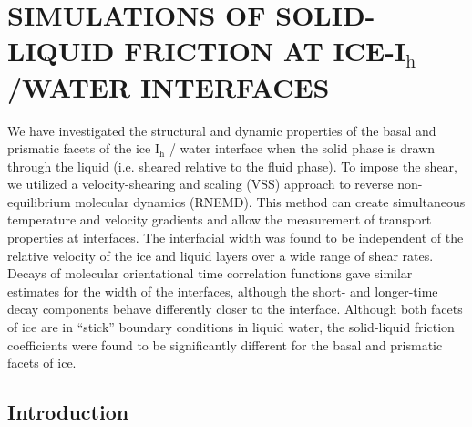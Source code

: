 \chapter{SIMULATIONS OF SOLID-LIQUID FRICTION AT ICE-I$_\mathrm{h}$ /WATER INTERFACES}

 We have investigated the structural and dynamic properties of the
  basal and prismatic facets of the ice I$_\mathrm{h}$ / water
  interface when the solid phase is drawn through the liquid
  (i.e. sheared relative to the fluid phase). To impose the shear, we
  utilized a velocity-shearing and scaling (VSS) approach to reverse
  non-equilibrium molecular dynamics (RNEMD).  This method can create
  simultaneous temperature and velocity gradients and allow the
  measurement of transport properties at interfaces.  The interfacial
  width was found to be independent of the relative velocity of the
  ice and liquid layers over a wide range of shear rates.  Decays of
  molecular orientational time correlation functions gave similar
  estimates for the width of the interfaces, although the short- and
  longer-time decay components behave differently closer to the
  interface.  Although both facets of ice are in ``stick'' boundary
  conditions in liquid water, the solid-liquid friction coefficients
  were found to be significantly different for the basal and prismatic
  facets of ice.


\section{Introduction}


